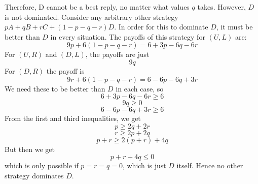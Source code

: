 \documentclass[10pt,letter]{article}
\begin{document}
Therefore, D cannot be a best reply, no matter what values $q$ takes. However, $D$ is not dominated. Consider any arbitrary other strategy $pA + qB + rC + (1-p-q-r)D$. In order for this to dominate $D$, it must be better than $D$ in every situation. The payoffs of this strategy for $(U, L)$ are:
\[ 9p + 6(1-p-q-r) = 6 + 3p - 6q - 6r \]
For $(U, R)$ and $(D,L)$, the payoffs are just
\[ 9q \]
For $(D, R)$ the payoff is
\[ 9r + 6(1-p-q-r) = 6 - 6p - 6q + 3r \]
We need these to be better than $D$ in each case, so
\[ 6 + 3p - 6q - 6r \ge 6 \]
\[ 9q \ge 0 \]
\[ 6 - 6p - 6q + 3r \ge 6 \]
From the first and third inequalities, we get
\[ p \ge 2q + 2r \]
\[ r \ge 2p + 2q \]
\[ p + r \ge 2(p + r) + 4q \]
But then we get
\[ p + r + 4q \le 0 \]
which is only possible if $p = r = q = 0$, which is just $D$ itself. Hence no other strategy dominates $D$.
\end{document}
